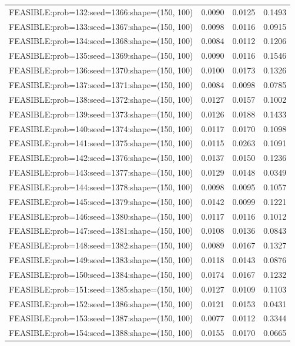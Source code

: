 \begin{longtable}{lccc}
FEASIBLE:prob=132:seed=1366:shape=(150, 100) & 0.0090 & 0.0125 & 0.1493 \\
FEASIBLE:prob=133:seed=1367:shape=(150, 100) & 0.0098 & 0.0116 & 0.0915 \\
FEASIBLE:prob=134:seed=1368:shape=(150, 100) & 0.0084 & 0.0112 & 0.1206 \\
FEASIBLE:prob=135:seed=1369:shape=(150, 100) & 0.0090 & 0.0116 & 0.1546 \\
FEASIBLE:prob=136:seed=1370:shape=(150, 100) & 0.0100 & 0.0173 & 0.1326 \\
FEASIBLE:prob=137:seed=1371:shape=(150, 100) & 0.0084 & 0.0098 & 0.0785 \\
FEASIBLE:prob=138:seed=1372:shape=(150, 100) & 0.0127 & 0.0157 & 0.1002 \\
FEASIBLE:prob=139:seed=1373:shape=(150, 100) & 0.0126 & 0.0188 & 0.1433 \\
FEASIBLE:prob=140:seed=1374:shape=(150, 100) & 0.0117 & 0.0170 & 0.1098 \\
FEASIBLE:prob=141:seed=1375:shape=(150, 100) & 0.0115 & 0.0263 & 0.1091 \\
FEASIBLE:prob=142:seed=1376:shape=(150, 100) & 0.0137 & 0.0150 & 0.1236 \\
FEASIBLE:prob=143:seed=1377:shape=(150, 100) & 0.0129 & 0.0148 & 0.0349 \\
FEASIBLE:prob=144:seed=1378:shape=(150, 100) & 0.0098 & 0.0095 & 0.1057 \\
FEASIBLE:prob=145:seed=1379:shape=(150, 100) & 0.0142 & 0.0099 & 0.1221 \\
FEASIBLE:prob=146:seed=1380:shape=(150, 100) & 0.0117 & 0.0116 & 0.1012 \\
FEASIBLE:prob=147:seed=1381:shape=(150, 100) & 0.0108 & 0.0136 & 0.0843 \\
FEASIBLE:prob=148:seed=1382:shape=(150, 100) & 0.0089 & 0.0167 & 0.1327 \\
FEASIBLE:prob=149:seed=1383:shape=(150, 100) & 0.0118 & 0.0143 & 0.0876 \\
FEASIBLE:prob=150:seed=1384:shape=(150, 100) & 0.0174 & 0.0167 & 0.1232 \\
FEASIBLE:prob=151:seed=1385:shape=(150, 100) & 0.0127 & 0.0109 & 0.1103 \\
FEASIBLE:prob=152:seed=1386:shape=(150, 100) & 0.0121 & 0.0153 & 0.0431 \\
FEASIBLE:prob=153:seed=1387:shape=(150, 100) & 0.0077 & 0.0112 & 0.3344 \\
FEASIBLE:prob=154:seed=1388:shape=(150, 100) & 0.0155 & 0.0170 & 0.0665 \\

\end{longtable}
